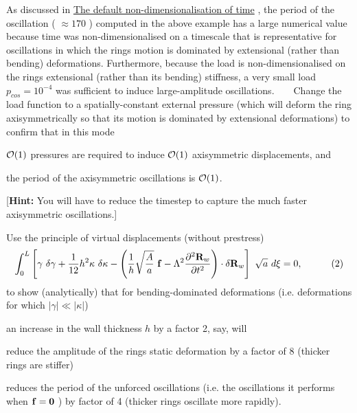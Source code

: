 \begin{DoxyEnumerate}
\item As discussed in \hyperlink{index_timescale}{The default non-\/dimensionalisation of time} , the period of the oscillation ( $ \approx 170 $ ) computed in the above example has a large numerical value because time was non-\/dimensionalised on a timescale that is representative for oscillations in which the ring\textquotesingle{}s motion is dominated by extensional (rather than bending) deformations. Furthermore, because the load is non-\/dimensionalised on the ring\textquotesingle{}s extensional (rather than its bending) stiffness, a very small load $ p_{cos} = 10^{-4} $ was sufficient to induce large-\/amplitude oscillations. ~\newline
 ~\newline
 Change the load function to a spatially-\/constant external pressure (which will deform the ring axisymmetrically so that its motion is dominated by extensional deformations) to confirm that in this mode
\begin{DoxyEnumerate}
\item $ {\cal O}(1) $ pressures are required to induce $ {\cal O}(1) $ axisymmetric displacements, and
\item the period of the axisymmetric oscillations is $ {\cal O}(1) $.
\end{DoxyEnumerate}\mbox{[}{\bfseries Hint\+:} You will have to reduce the timestep to capture the much faster axisymmetric oscillations.\mbox{]}
\item Use the principle of virtual displacements (without prestress) \[ \int_0^{L} \left[ \gamma \ \delta \gamma + \frac{1}{12} h^2 \kappa \ \delta \kappa - \left(\frac{1}{h} \sqrt{\frac{A}{a}} \ {\bf f} - \Lambda^2 \frac{\partial^2 {\bf R}_w}{\partial t^2} \right) \cdot \delta {\bf R}_w \right] \ \sqrt{a} \ d\xi = 0, \ \ \ \ \ \ \ \ \ (2) \] to show (analytically) that for bending-\/dominated deformations (i.\+e. deformations for which $ |\gamma| \ll |\kappa| $)
\begin{DoxyEnumerate}
\item an increase in the wall thickness $ h $ by a factor 2, say, will
\begin{DoxyEnumerate}
\item reduce the amplitude of the ring\textquotesingle{}s static deformation by a factor of 8 (thicker rings are stiffer)
\item reduces the period of the unforced oscillations (i.\+e. the oscillations it performs when $ {\bf f} = {\bf 0} $ ) by factor of 4 (thicker rings oscillate more rapidly).

\end{DoxyEnumerate}
\end{DoxyEnumerate}
\end{DoxyEnumerate}
